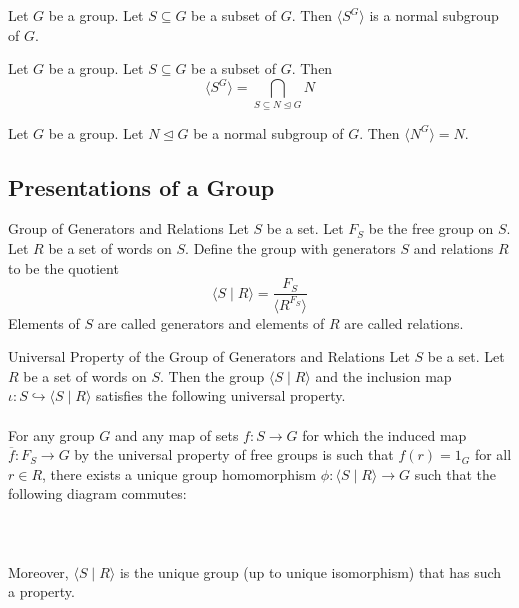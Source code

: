 \documentclass[a4paper]{article}
\begin{document}
\begin{lmm}{}{} Let $G$ be a group. Let $S\subseteq G$ be a subset of $G$. Then $\langle S^G\rangle$ is a normal subgroup of $G$. 
\end{lmm}

\begin{lmm}{}{} Let $G$ be a group. Let $S\subseteq G$ be a subset of $G$. Then $$\langle S^G\rangle=\bigcap_{S\subseteq N\trianglelefteq G}N$$
\end{lmm}

\begin{lmm}{}{} Let $G$ be a group. Let $N\trianglelefteq G$ be a normal subgroup of $G$. Then $\langle N^G\rangle=N$. 
\end{lmm}

\subsection{Presentations of a Group}
\begin{defn}{Group of Generators and Relations}{} Let $S$ be a set. Let $F_S$ be the free group on $S$. Let $R$ be a set of words on $S$. Define the group with generators $S$ and relations $R$ to be the quotient $$\langle S\;|\;R\rangle=\frac{F_S}{\langle R^{F_S}\rangle}$$ Elements of $S$ are called generators and elements of $R$ are called relations. 
\end{defn}

\begin{prp}{Universal Property of the Group of Generators and Relations}{} Let $S$ be a set. Let $R$ be a set of words on $S$. Then the group $\langle S\;|\;R\rangle$ and the inclusion map $\iota:S\hookrightarrow\langle S\;|\;R\rangle$ satisfies the following universal property. \\~\\

For any group $G$ and any map of sets $f:S\to G$ for which the induced map $\overline{f}:F_S\to G$ by the universal property of free groups is such that $f(r)=1_G$ for all $r\in R$, there exists a unique group homomorphism $\phi:\langle S\;|\;R\rangle\to G$ such that the following diagram commutes: \\~\\
 \\~\\
Moreover, $\langle S\;|\;R\rangle$ is the unique group (up to unique isomorphism) that has such a property. 
\end{prp}
\end{document}

